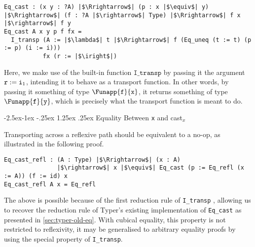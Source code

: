 \documentclass[12pt,twoside,maitrise]{dms}
\makeatletter
\theoremstyle{definition}
\numberwithin{equation}{section}
\numberwithin{table}{chapter}
\numberwithin{figure}{chapter}
\newcommand\kw[1] {\textsf{#1}}
\newcommand\id[1] {\texttt{#1}}
\renewcommand\paragraph{\@startsection{paragraph}{4}{\z@}%
            {-2.5ex\@plus -1ex \@minus -.25ex}%
            {1.25ex \@plus .25ex}%
            {\normalfont\normalsize\bfseries}}
\makeatother
\begin{document}

\begin{verbatim}
Eq_cast : (x y : ?A) |$\Rrightarrow$| (p : x |$\equiv$| y) |$\Rrightarrow$| (f : ?A |$\rightarrow$| Type) |$\Rrightarrow$| f x |$\rightarrow$| f y
Eq_cast A x y p f fx =
  I_transp (A := |$\lambda$| t |$\Rrightarrow$| f (Eq_uneq (t := t) (p := p) (i := i)))
           fx (r := |$\iright$|)
\end{verbatim}

Here, we make use of the built-in function $\id{I\_transp}$ by passing it the
argument $\earg{\id{r}}{\iright}$, intending it to behave as a transport
function. In other words, by passing it something of type
$\Funapp{\id{f}}{\id{x}}$, it returns something of type
$\Funapp{\id{f}}{\id{y}}$, which is precisely what the transport function is
meant to do.

\paragraph{Equality Between \id{x} and \kw{cast}$_x$}\label{app:cast-is-eq}

Transporting across a reflexive path should be equivalent to a no-op, as
illustrated in the following proof.

\begin{verbatim}
Eq_cast_refl : (A : Type) |$\Rrightarrow$| (x : A)
               |$\rightarrow$| x |$\equiv$| Eq_cast (p := Eq_refl (x := A)) (f := id) x
Eq_cast_refl A x = Eq_refl
\end{verbatim}

The above is possible because of the first reduction rule of \id{I\_transp} ,
allowing us to recover the reduction rule of Typer's existing implementation of
\id{Eq\_cast} as presented in \autoref{sec:typer-old-eq}. With cubical equality,
this property is not restricted to reflexivity, it may be generalised to
arbitrary equality proofs by using the special property of \id{I\_transp}.
\end{document}
